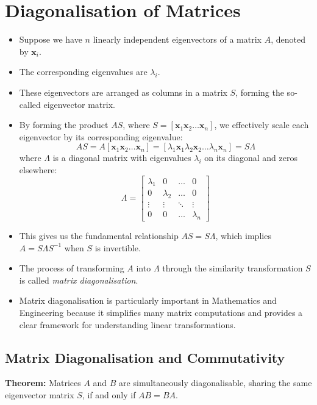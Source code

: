 \section{Diagonalisation of Matrices}
\begin{itemize}
    \item Suppose we have \( n \) linearly independent eigenvectors of a matrix \( A \), denoted by \( \mathbf{x}_i \).
    \item The corresponding eigenvalues are \( \lambda_i \).
    \item These eigenvectors are arranged as columns in a matrix \( S \), forming the so-called eigenvector matrix.
    \item By forming the product \( AS \), where \( S = [\mathbf{x}_1 \mathbf{x}_2 \ldots \mathbf{x}_n] \), we effectively scale each eigenvector by its corresponding eigenvalue:
    \[
    AS = A[\mathbf{x}_1 \mathbf{x}_2 \ldots \mathbf{x}_n] = [\lambda_1\mathbf{x}_1 \lambda_2\mathbf{x}_2 \ldots \lambda_n\mathbf{x}_n] = S\Lambda
    \]
    where \( \Lambda \) is a diagonal matrix with eigenvalues \( \lambda_i \) on its diagonal and zeros elsewhere:
    \[
    \Lambda = \begin{bmatrix}
    \lambda_1 & 0 & \ldots & 0 \\
    0 & \lambda_2 & \ldots & 0 \\
    \vdots & \vdots & \ddots & \vdots \\
    0 & 0 & \ldots & \lambda_n
    \end{bmatrix}
    \]
    \item This gives us the fundamental relationship \( AS = S\Lambda \), which implies \( A = S\Lambda S^{-1} \) when \( S \) is invertible.
    \item The process of transforming \( A \) into \( \Lambda \) through the similarity transformation \( S \) is called \emph{matrix diagonalisation}.
    \item Matrix diagonalisation is particularly important in Mathematics and Engineering because it simplifies many matrix computations and provides a clear framework for understanding linear transformations.
\end{itemize}

\subsection{Matrix Diagonalisation and Commutativity}

\textbf{Theorem:} Matrices \( A \) and \( B \) are simultaneously diagonalisable, sharing the same eigenvector matrix \( S \), if and only if \( AB = BA \).\\

